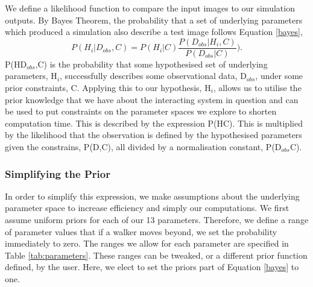 We define a likelihood function to compare the input images to our simulation outputs. By Bayes Theorem, the probability that a set of underlying parameters which produced a simulation also describe a test image follows Equation \ref{bayes},
\begin{equation}\label{bayes}
P(H_{i}|D_{obs},C) = P(H_{i}|C)\frac{P(D_{obs}|H_{i},C)}{P(D_{obs}|C)}).
\end{equation}
P(H\DIFdelbegin {}\DIFdelend \DIFaddbegin {}\DIFaddend D$_{obs}$,C) is the probability that some hypothesised set of underlying parameters, H$_{i}$, successfully describes some observational data, D$_{obs}$, under some prior constraints, C. Applying this to our hypothesis, H$_{i}$, allows us to utilise the prior knowledge that we have about the interacting system in question and can be used to put constraints on the parameter spaces we explore to shorten computation time. This is described by the expression P(H\DIFdelbegin {}\DIFdelend \DIFaddbegin {}\DIFaddend C). This is multiplied by the likelihood that the observation is defined by the hypothesised parameters given the constrains, P(D\DIFdelbegin {}\DIFdelend \DIFaddbegin {}\DIFaddend ,C), all divided by a normalisation constant, P(D$_{obs}$\DIFdelbegin \DIFdel{|}\DIFdelend \DIFaddbegin \DIFadd{$|$}\DIFaddend C).

\subsubsection{Simplifying the Prior}
In order to simplify this expression, we make assumptions about the underlying parameter space to increase efficiency and simply our computations. We first assume uniform priors for each of our 13 parameters. Therefore, we define a range of parameter values that if a walker moves beyond, we set the probability immediately to zero. The ranges we allow for each parameter are specified in Table \ref{tab:parameters}. These ranges can be tweaked, or a different prior function defined, by the user. Here, we elect to set the priors part of Equation \ref{bayes} to one.

